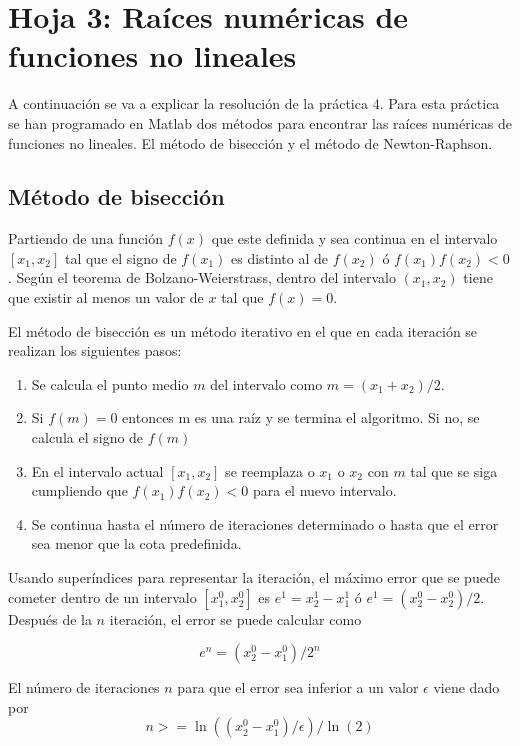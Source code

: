 \section{Hoja 3: Raíces numéricas de funciones no lineales}

A continuación se va a explicar la resolución de la práctica 4. Para esta práctica se han programado en Matlab dos métodos para encontrar las raíces numéricas de funciones no lineales. El método de bisección y el método de Newton-Raphson.

\subsection{Método de bisección}
Partiendo de una función \(f(x)\) que este definida y sea continua en el intervalo \([x_1, x_2]\) tal que el signo de \(f(x_1)\) es distinto al de \(f(x_2)\) ó \(f(x_1)f(x_2) < 0\). Según el teorema de Bolzano-Weierstrass, dentro del intervalo \((x_1, x_2)\) tiene que existir al menos un valor de \(x\) tal que \(f(x) = 0\).

El método de bisección es un método iterativo en el que en cada iteración se realizan los siguientes pasos:

\begin{enumerate}
    \item Se calcula el punto medio \(m\) del intervalo como \(m = (x_1 + x_2)/2\).
    \item Si \(f(m) = 0\) entonces m es una raíz y se termina el algoritmo. Si no, se calcula el signo de \(f(m)\)
    \item En el intervalo actual \([x_1, x_2]\) se reemplaza o \(x_1\) o \(x_2\) con \(m\) tal que se siga cumpliendo que \(f(x_1)f(x_2) < 0\) para el nuevo intervalo.
    \item Se continua hasta el número de iteraciones determinado o hasta que el error sea menor que la cota predefinida.
\end{enumerate}

Usando superíndices para representar la iteración, el máximo error que se puede cometer dentro de un intervalo \([x_1^0, x_2^0]\) es \(e^1 = x_2^1 - x_1^1\) ó \(e^1 = (x_2^0 - x_2^0)/2\). Después de la \(n\) iteración, el error se puede calcular como

\[e^n = (x_2^0 - x_1^0)/2^n\]

El número de iteraciones \(n\) para que el error sea inferior a un valor \(\epsilon\) viene dado por
\[n >= \ln((x_2^0 - x_1^0) / \epsilon) / \ln(2)\]

